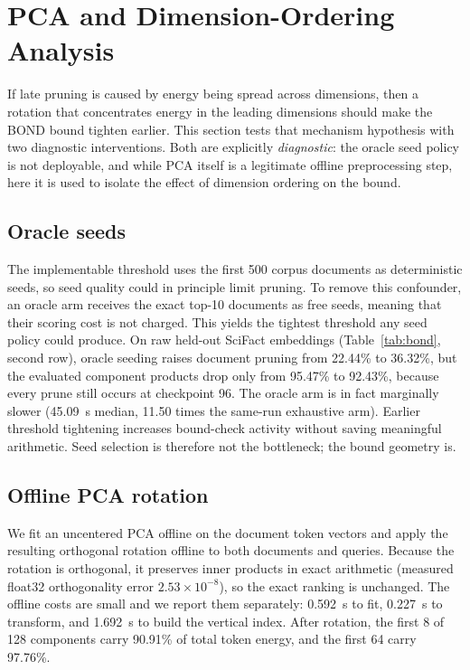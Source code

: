 \section{PCA and Dimension-Ordering Analysis}
\label{sec:results-pca}

If late pruning is caused by energy being spread across dimensions, then a
rotation that concentrates energy in the leading dimensions should make the
BOND bound tighten earlier. This section tests that mechanism hypothesis with
two diagnostic interventions. Both are explicitly \emph{diagnostic}: the
oracle seed policy is not deployable, and while PCA itself is a legitimate
offline preprocessing step, here it is used to isolate the effect of dimension
ordering on the bound.

\subsection{Oracle seeds}

The implementable threshold uses the first 500 corpus documents as 
deterministic seeds, so seed quality could in principle limit pruning. 
To remove this confounder, an oracle arm receives the exact top-10 documents 
as free seeds, meaning that their scoring cost is not charged. This yields 
the tightest threshold any seed policy could produce. On raw held-out 
SciFact embeddings (Table~\ref{tab:bond}, second row), oracle seeding raises 
document pruning from 22.44\% to 36.32\%, but the evaluated component products 
drop only from 95.47\% to 92.43\%, because every prune still occurs at 
checkpoint 96. The oracle arm is in fact marginally slower 
(\SI{45.09}{\second} median, 11.50 times the same-run exhaustive arm). Earlier threshold tightening 
increases bound-check activity without saving meaningful arithmetic. Seed 
selection is therefore not the bottleneck; the bound geometry is.

\subsection{Offline PCA rotation}

We fit an uncentered PCA offline on the document token vectors and apply 
the resulting orthogonal rotation offline to both documents and queries. 
Because the rotation is orthogonal, it preserves inner products in exact 
arithmetic (measured float32 orthogonality error $2.53 \times 10^{-8}$), 
so the exact ranking is unchanged. The offline costs are small and we 
report them separately: \SI{0.592}{\second} to fit, \SI{0.227}{\second} to transform, 
and \SI{1.692}{\second} to build the vertical index. After rotation, the first 8 
of 128 components carry 90.91\% of total token energy, and the first 64 
carry 97.76\%.

